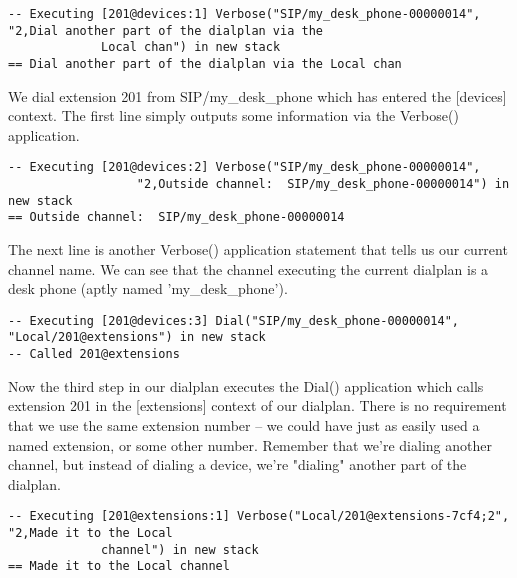 \begin{astlisting}
\begin{verbatim}
-- Executing [201@devices:1] Verbose("SIP/my_desk_phone-00000014", "2,Dial another part of the dialplan via the 
             Local chan") in new stack
== Dial another part of the dialplan via the Local chan
\end{verbatim}
\end{astlisting}

We dial extension 201 from SIP/my\_desk\_phone which has entered the [devices]
context. The first line simply outputs some information via the Verbose()
application.

\begin{astlisting}
\begin{verbatim}
-- Executing [201@devices:2] Verbose("SIP/my_desk_phone-00000014", 
                  "2,Outside channel:  SIP/my_desk_phone-00000014") in new stack
== Outside channel:  SIP/my_desk_phone-00000014
\end{verbatim}
\end{astlisting}

The next line is another Verbose() application statement that tells us our
current channel name. We can see that the channel executing the current dialplan
is a desk phone (aptly named 'my\_desk\_phone').

\begin{astlisting}
\begin{verbatim}
-- Executing [201@devices:3] Dial("SIP/my_desk_phone-00000014", "Local/201@extensions") in new stack
-- Called 201@extensions
\end{verbatim}
\end{astlisting}

Now the third step in our dialplan executes the Dial() application which calls
extension 201 in the [extensions] context of our dialplan. There is no
requirement that we use the same extension number -- we could have just as
easily used a named extension, or some other number. Remember that we're dialing
another channel, but instead of dialing a device, we're "dialing" another part
of the dialplan.

\begin{astlisting}
\begin{verbatim}
-- Executing [201@extensions:1] Verbose("Local/201@extensions-7cf4;2", "2,Made it to the Local 
             channel") in new stack
== Made it to the Local channel
\end{verbatim}
\end{astlisting}

